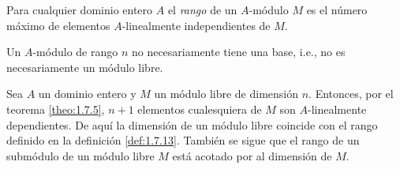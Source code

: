 \begin{definition}\label{def:1.7.13}%
  Para cualquier dominio entero $A$ el \emph{rango} de un $A$-módulo $M$ es el número máximo de elementos $A$-linealmente independientes de $M$.
\end{definition}

Un $A$-módulo de rango $n$ no necesariamente tiene una base, i.e., no es necesariamente un módulo libre.

Sea $A$ un dominio entero y $M$ un módulo libre de dimensión $n$. Entonces, por el teorema \ref{theo:1.7.5}, $n+1$ elementos cualesquiera de $M$ son $A$-linealmente dependientes. De aquí la dimensión de un módulo libre coincide con el rango definido en la definición \ref{def:1.7.13}. También se sigue que el rango de un submódulo de un módulo libre $M$ está acotado por al dimensión de $M$.

